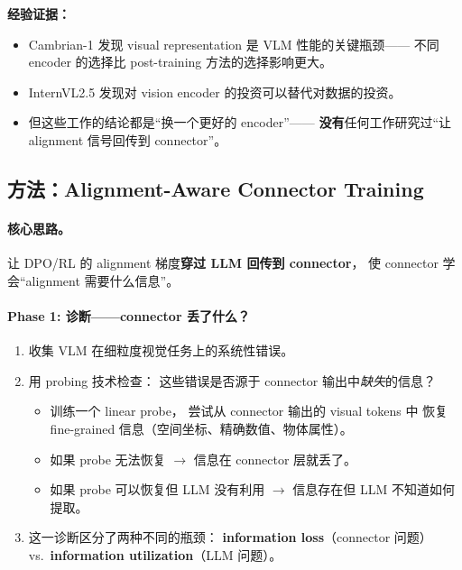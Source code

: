 \documentclass[12pt,a4paper]{article}
\begin{document}
\noindent
\textbf{经验证据：}
\begin{itemize}[leftmargin=2em]
  \item Cambrian-1 发现 visual representation 是 VLM 性能的关键瓶颈——
    不同 encoder 的选择比 post-training 方法的选择影响更大。
  \item InternVL2.5 发现对 vision encoder 的投资可以替代对数据的投资。
  \item 但这些工作的结论都是``换一个更好的 encoder''——
    \textbf{没有}任何工作研究过``让 alignment 信号回传到 connector''。
\end{itemize}

\subsection{方法：Alignment-Aware Connector Training}

\paragraph{核心思路。}
让 DPO/RL 的 alignment 梯度\textbf{穿过 LLM 回传到 connector}，
使 connector 学会``alignment 需要什么信息''。

\paragraph{Phase 1: 诊断——connector 丢了什么？}

\begin{enumerate}[leftmargin=2em]
  \item 收集 VLM 在细粒度视觉任务上的系统性错误。
  \item 用 probing 技术检查：
    这些错误是否源于 connector 输出中\textit{缺失}的信息？
    \begin{itemize}
      \item 训练一个 linear probe，
        尝试从 connector 输出的 visual tokens 中
        恢复 fine-grained 信息（空间坐标、精确数值、物体属性）。
      \item 如果 probe 无法恢复 $\rightarrow$ 信息在 connector 层就丢了。
      \item 如果 probe 可以恢复但 LLM 没有利用
        $\rightarrow$ 信息存在但 LLM 不知道如何提取。
    \end{itemize}
  \item 这一诊断区分了两种不同的瓶颈：
    \textbf{information loss}（connector 问题）
    vs.\ \textbf{information utilization}（LLM 问题）。
\end{enumerate}
\end{document}
